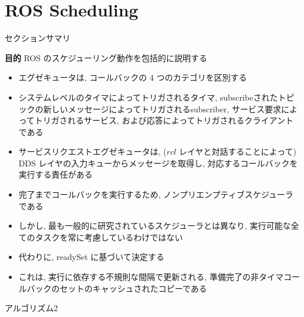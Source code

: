 
\section{ROS Scheduling}
\label{sec: ros scheduling}


\begin{frame}{セクションサマリ}
    \begin{itembox}[l]{\textbf{目的}}
        ROS のスケジューリング動作を包括的に説明する
    \end{itembox}
\end{frame}

\begin{frame}{}
    \begin{itemize}
        \item エグゼキュータは, コールバックの 4 つのカテゴリを区別する
\item システムレベルのタイマによってトリガされるタイマ, subscribeされたトピックの新しいメッセージによってトリガされるsubscriber, サービス要求によってトリガされるサービス, および応答によってトリガされるクライアントである
\item サービスリクエストエグゼキュータは, ($r c l$ レイヤと対話することによって) DDS レイヤの入力キューからメッセージを取得し, 対応するコールバックを実行する責任がある
\item 完了までコールバックを実行するため, ノンプリエンプティブスケジューラである
    \end{itemize}
\end{frame}

\begin{frame}{}
    \begin{itemize}
        \item しかし, 最も一般的に研究されているスケジューラとは異なり, 実行可能な全てのタスクを常に考慮しているわけではない
\item 代わりに, readySet に基づいて決定する
\item これは, 実行に依存する不規則な間隔で更新される, 準備完了の非タイマコールバックのセットのキャッシュされたコピーである
    \end{itemize}
\end{frame}

\begin{frame}{アルゴリズム2}
\end{frame}

